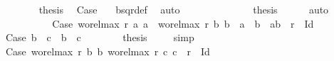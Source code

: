 \begin{isabellebody}
\ \ \ \ \ \ \isamarkupfalse%
\ {\isacharquery}{\kern0pt}thesis\ \isamarkupfalse%
\ Case{}\ {}\ \isamarkupfalse%
\ bsqr{\isacharunderscore}{\kern0pt}def\ \isamarkupfalse%
\ auto\isanewline
\ \ \ \ \ \isacommand{{\isacharbraceright}{\kern0pt}}\isamarkupfalse%
\isanewline
\ \ \ \ \ \isamarkupfalse%
\ \isamarkupfalse%
\ {\isacharquery}{\kern0pt}thesis\ \isamarkupfalse%
\ {}\ {}\ \isamarkupfalse%
\ auto\isanewline
\ \ \ \ \isacommand{{\isacharbraceright}{\kern0pt}}\isamarkupfalse%
\isanewline
\ \ \ \ \isamarkupfalse%
\isanewline
\ \ \ \ \isacommand{{\isacharbraceleft}{\kern0pt}}\isamarkupfalse%
\isamarkupfalse%
\ Case{}{\isacharcolon}{\kern0pt}\ {\isachardoublequoteopen}wo{\isacharunderscore}{\kern0pt}rel{\isachardot}{\kern0pt}max{}\ r\ a{}\ a{}\ {\isacharequal}{\kern0pt}\ wo{\isacharunderscore}{\kern0pt}rel{\isachardot}{\kern0pt}max{}\ r\ b{}\ b{}\ {\isasymand}\ a{}\ {\isacharequal}{\kern0pt}\ b{}\ {\isasymand}\ {\isacharparenleft}{\kern0pt}a{}{\isacharcomma}{\kern0pt}b{}{\isacharparenright}{\kern0pt}\ {\isasymin}\ r\ {\isacharminus}{\kern0pt}\ Id{\isachardoublequoteclose}\isanewline
\ \ \ \ \ \isacommand{{\isacharbraceleft}{\kern0pt}}\isamarkupfalse%
\isamarkupfalse%
\ Case{}{}{\isacharcolon}{\kern0pt}\ {\isachardoublequoteopen}b{}\ {\isacharequal}{\kern0pt}\ c{}\ {\isasymand}\ b{}\ {\isacharequal}{\kern0pt}\ c{}{\isachardoublequoteclose}\isanewline
\ \ \ \ \ \ \isamarkupfalse%
\ {\isacharquery}{\kern0pt}thesis\ \isamarkupfalse%
\ {\isacharasterisk}{\kern0pt}\ \isamarkupfalse%
\ simp\isanewline
\ \ \ \ \ \isacommand{{\isacharbraceright}{\kern0pt}}\isamarkupfalse%
\isanewline
\ \ \ \ \ \isamarkupfalse%
\isanewline
\ \ \ \ \ \isacommand{{\isacharbraceleft}{\kern0pt}}\isamarkupfalse%
\isamarkupfalse%
\ Case{}{}{\isacharcolon}{\kern0pt}\ {\isachardoublequoteopen}{\isacharparenleft}{\kern0pt}wo{\isacharunderscore}{\kern0pt}rel{\isachardot}{\kern0pt}max{}\ r\ b{}\ b{}{\isacharcomma}{\kern0pt}\ wo{\isacharunderscore}{\kern0pt}rel{\isachardot}{\kern0pt}max{}\ r\ c{}\ c{}{\isacharparenright}{\kern0pt}\ {\isasymin}\ r\ {\isacharminus}{\kern0pt}\ Id{\isachardoublequoteclose}\isanewline

\end{isabellebody}
